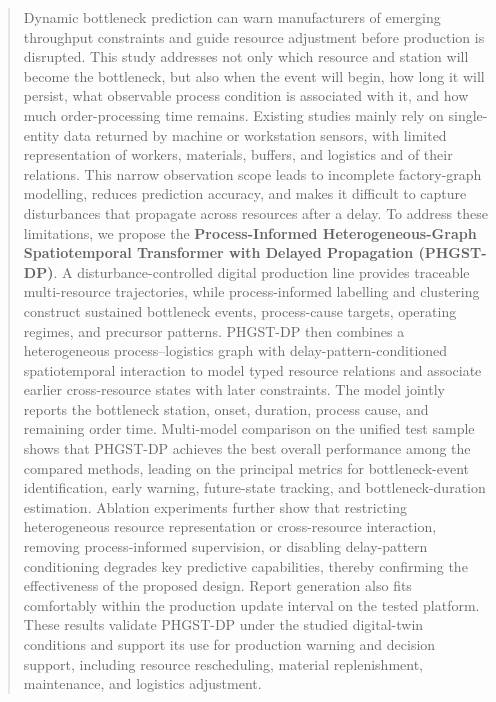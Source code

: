 \documentclass[a4paper,fleqn]{cas-dc}
\begin{document}
\begin{abstract}
Dynamic bottleneck prediction can warn manufacturers of emerging throughput constraints and guide resource adjustment before production is disrupted.
This study addresses not only which resource and station will become the bottleneck, but also when the event will begin, how long it will persist, what observable process condition is associated with it, and how much order-processing time remains.
Existing studies mainly rely on single-entity data returned by machine or workstation sensors, with limited representation of workers, materials, buffers, and logistics and of their relations.
This narrow observation scope leads to incomplete factory-graph modelling, reduces prediction accuracy, and makes it difficult to capture disturbances that propagate across resources after a delay.
To address these limitations, we propose the \textbf{Process-Informed Heterogeneous-Graph Spatiotemporal Transformer with Delayed Propagation (PHGST-DP)}.
A disturbance-controlled digital production line provides traceable multi-resource trajectories, while process-informed labelling and clustering construct sustained bottleneck events, process-cause targets, operating regimes, and precursor patterns.
PHGST-DP then combines a heterogeneous process--logistics graph with delay-pattern-conditioned spatiotemporal interaction to model typed resource relations and associate earlier cross-resource states with later constraints.
The model jointly reports the bottleneck station, onset, duration, process cause, and remaining order time.
Multi-model comparison on the unified test sample shows that PHGST-DP achieves the best overall performance among the compared methods, leading on the principal metrics for bottleneck-event identification, early warning, future-state tracking, and bottleneck-duration estimation.
Ablation experiments further show that restricting heterogeneous resource representation or cross-resource interaction, removing process-informed supervision, or disabling delay-pattern conditioning degrades key predictive capabilities, thereby confirming the effectiveness of the proposed design.
Report generation also fits comfortably within the production update interval on the tested platform.
These results validate PHGST-DP under the studied digital-twin conditions and support its use for production warning and decision support, including resource rescheduling, material replenishment, maintenance, and logistics adjustment.


\end{abstract}
\end{document}
